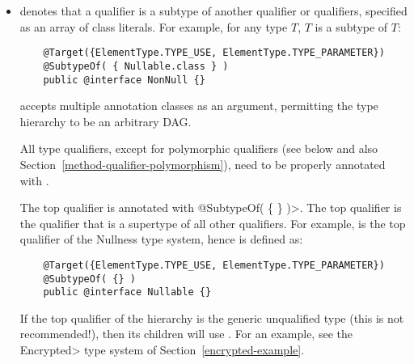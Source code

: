 \begin{itemize}

\item {} denotes that a qualifier is a subtype of
  another qualifier or qualifiers, specified as an array of class
  literals.  For example, for any type $T$,
   $T$ is a subtype of  $T$:

  \begin{Verbatim}
    @Target({ElementType.TYPE_USE, ElementType.TYPE_PARAMETER})
    @SubtypeOf( { Nullable.class } )
    public @interface NonNull {}
  \end{Verbatim}



   accepts multiple annotation classes as an argument,
  permitting the type hierarchy to be an arbitrary DAG\@.


  All type qualifiers, except for polymorphic qualifiers (see below and
  also Section~\ref{method-qualifier-polymorphism}), need to be
  properly annotated with .

  The top qualifier is annotated with
  \<@SubtypeOf( \{ \} )>.  The top qualifier is the qualifier that is
  a supertype of all other qualifiers.  For example, 
  is the top qualifier of the Nullness type system, hence is defined as:

  \begin{Verbatim}
    @Target({ElementType.TYPE_USE, ElementType.TYPE_PARAMETER})
    @SubtypeOf( {} )
    public @interface Nullable {}
  \end{Verbatim}

  \begin{sloppypar}
  If the top qualifier of the hierarchy is the generic unqualified type
  (this is not recommended!), then its children
  will use .  For an example, see the
  \<Encrypted> type system of Section~\ref{encrypted-example}.
  \end{sloppypar}


\end{itemize}
